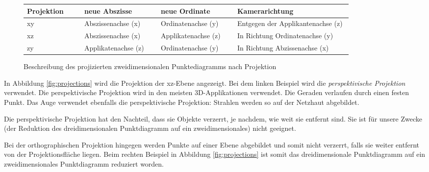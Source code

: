 \begin{figure}[H]
	\centering
	\begin{tabular}{ | m{0.15\linewidth} | m{0.2\linewidth} |m{0.2\linewidth} | m{0.3\linewidth} |}
		\hline
		\textbf{Projektion} & \textbf{neue Abszisse} & \textbf{neue Ordinate} & \textbf{Kamerarichtung}\\ \hline
		xy & Abszissenachse (x) & Ordinatenachse (y) & Entgegen der Applikantenachse (z) \\ \hline
		xz & Abszissenachse (x) & Applikatenachse (z) & In Richtung Ordinatenachse (y)\\ \hline
		zy & Applikatenachse (z) & Ordinatenachse (y) & In Richtung Abzissenachse (x) \\ \hline
	\end{tabular}
	\caption{Beschreibung des projizierten zweidimensionalen Punktediagramms nach Projektion}
	\label{fig:3dtable}
\end{figure}

In Abbildung \ref{fig:projections} wird die Projektion der xz-Ebene angezeigt. Bei dem linken Beispiel wird die \textit{perspektivische Projektion} verwendet. Die perspektivische Projektion wird in den meisten 3D-Applikationen verwendet. Die Geraden verlaufen durch einen festen Punkt. Das Auge verwendet ebenfalls die perspektivische Projektion: Strahlen werden so auf der Netzhaut abgebildet.

Die perspektivische Projektion hat den Nachteil, dass sie Objekte verzerrt, je nachdem, wie weit sie entfernt sind. Sie ist für unsere Zwecke (der Reduktion des dreidimensionalen Punktdiagramm auf ein zweidimensionales) nicht geeignet.

Bei der orthographischen Projektion hingegen werden Punkte auf einer Ebene abgebildet und somit nicht verzerrt, falls sie weiter entfernt von der Projektionsfläche liegen. Beim rechten Beispiel in Abbildung \ref{fig:projections} ist somit das dreidimensionale Punktdiagramm auf ein zweidimensionales Punktdiagramm reduziert worden.

